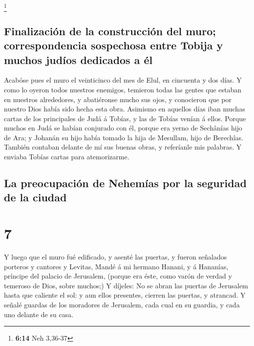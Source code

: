 \footnote{\textbf{6:14} Neh 3,36-37}

\hypertarget{finalizaciuxf3n-de-la-construcciuxf3n-del-muro-correspondencia-sospechosa-entre-tobija-y-muchos-juduxedos-dedicados-a-uxe9l}{%
\subsection{Finalización de la construcción del muro; correspondencia
sospechosa entre Tobija y muchos judíos dedicados a
él}\label{finalizaciuxf3n-de-la-construcciuxf3n-del-muro-correspondencia-sospechosa-entre-tobija-y-muchos-juduxedos-dedicados-a-uxe9l}}

 Acabóse pues el muro el veinticinco del mes de Elul, en
cincuenta y dos días.  Y como lo oyeron todos nuestros
enemigos, temieron todas las gentes que estaban en nuestros alrededores,
y abatiéronse mucho sus ojos, y conocieron que por nuestro Dios había
sido hecha esta obra.  Asimismo en aquellos días iban
muchas cartas de los principales de Judá á Tobías, y las de Tobías
venían á ellos.  Porque muchos en Judá se habían
conjurado con él, porque era yerno de Sechânías hijo de Ara; y Johanán
su hijo había tomado la hija de Mesullam, hijo de Berechîas.
 También contaban delante de mí sus buenas obras, y
referíanle mis palabras. Y enviaba Tobías cartas para atemorizarme.

\hypertarget{la-preocupaciuxf3n-de-nehemuxedas-por-la-seguridad-de-la-ciudad}{%
\subsection{La preocupación de Nehemías por la seguridad de la
ciudad}\label{la-preocupaciuxf3n-de-nehemuxedas-por-la-seguridad-de-la-ciudad}}

\hypertarget{section-6}{%
\section{7}\label{section-6}}

 Y luego que el muro fué edificado, y asenté las puertas,
y fueron señalados porteros y cantores y Levitas,  Mandé á
mi hermano Hanani, y á Hananías, príncipe del palacio de Jerusalem,
(porque era éste, como varón de verdad y temeroso de Dios, sobre
muchos;)  Y díjeles: No se abran las puertas de Jerusalem
hasta que caliente el sol: y aun ellos presentes, cierren las puertas, y
atrancad. Y señalé guardas de los moradores de Jerusalem, cada cual en
su guardia, y cada uno delante de su casa.

